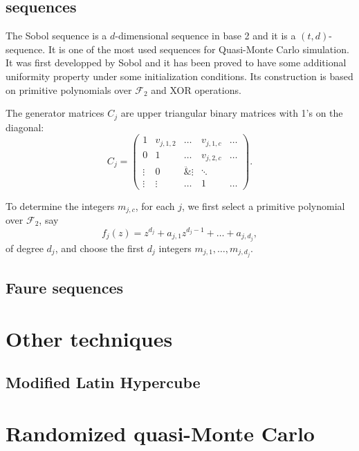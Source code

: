 \subsection{ sequences}

The Sobol sequence is a $d$-dimensional sequence in base 2 and it is a
$(t,d)$-sequence. It is one of the most used sequences for Quasi-Monte
Carlo simulation. It was first developped by Sobol and it has been
proved to have some additional uniformity property under some
initialization conditions. Its construction is based on
primitive polynomials over $\mathcal{F}_2$ and XOR operations.
 
The generator matrices $C_j$ are upper triangular binary matrices with
1's on the diagonal:
\[
C_j = \begin{pmatrix}
1 & v_{j,1,2} & \ldots & v_{j,1,c} & \ldots \\
0 & 1 & \ldots & v_{j,2,c} & \ldots \\
\vdots & 0 & \ddot & \vdots & \ddots \\
\vdots & \vdots & \ldots & 1 & \ldots
\end{pmatrix}.
\]

To determine the integers $m_{j,c}$, for each $j$, we first select a
primitive polynomial over $\mathcal{F}_2$, say
\[
f_j(z) = z^{d_j} + a_{j,1}z^{d_j-1} + \ldots + a_{j,d_j},
\]
of degree $d_j$, and choose the first $d_j$ integers
$m_{j,1},\ldots,m_{j,d_j}$.

\subsection{Faure sequences}

\section{Other techniques}

\subsection{Modified Latin Hypercube}

\section{Randomized quasi-Monte Carlo}

